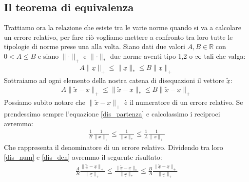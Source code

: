 \documentclass[12pt, a4paper]{book}
\theoremstyle{definition}
\newcommand{\VarMtrx}[1]{\ensuremath{\underline{#1}}}
\begin{document}
\subsection{Il teorema di equivalenza}
\begin{flushleft}
Trattiamo ora la relazione che esiste tra le varie norme quando si va a calcolare un errore relativo, per fare ciò vogliamo mettere a confronto tra loro tutte le tipologie di norme prese una alla volta. 
Siano dati due valori $A,B \in \mathbb{R}$ con $0<A \leq B$ e siano $\lVert \cdot \rVert_{+}$ e $\lVert \cdot \rVert_{*}$ due norme aventi tipo 1,2 o $\infty$ tali che valga: 
\begin{equation} \label{dis_partenza}
	\begin{split}
		A\lVert\VarMtrx{x}\rVert_{+} \leq \lVert\VarMtrx{x}\rVert_{*} \leq B\lVert\VarMtrx{x}\rVert_{+}
	\end{split}
\end{equation}
Sottraiamo ad ogni elemento della nostra catena di disequazioni il vettore $\widetilde{\VarMtrx{x}}$: 
\begin{equation} \label{dis_num}
	\begin{split}
		A\lVert\widetilde{\VarMtrx{x}} - \VarMtrx{x}\rVert_{+} \leq \lVert\widetilde{\VarMtrx{x}} - \VarMtrx{x}\rVert_{*} \leq B\lVert\widetilde{\VarMtrx{x}} - \VarMtrx{x}\rVert_{+}
	\end{split}
\end{equation}
Possiamo subito notare che $\lVert\widetilde{\VarMtrx{x}} - \VarMtrx{x}\rVert_{+}$ è il numeratore di un errore relativo.  Se prendessimo sempre l'equazione  \ref{dis_partenza} e calcolassimo i reciproci avremmo:
\begin{equation} \label{dis_den}
	\begin{split}
		\frac{1}{B}\frac{1}{\lVert\VarMtrx{x}\rVert_{+} }\leq \frac{1}{\lVert\VarMtrx{x}\rVert_{*}} \leq \frac{1}{A}\frac{1}{\lVert\VarMtrx{x}\rVert_{+} }
	\end{split}
\end{equation}
Che rappresenta il denominatore di un errore relativo.
Dividendo tra loro \ref{dis_num} e \ref{dis_den} avremmo il seguente risultato:
\begin{equation} \label{dis_err_rel}
	\begin{split}
		\frac{A}{B}\frac{\lVert\widetilde{\VarMtrx{x}} - \VarMtrx{x}\rVert_{+}}{\lVert\VarMtrx{x}\rVert_{+} }\leq \frac{\lVert\widetilde{\VarMtrx{x}} - \VarMtrx{x}\rVert_{*}}{\lVert\VarMtrx{x}\rVert_{*}} \leq \frac{B}{A}\frac{\lVert\widetilde{\VarMtrx{x}} - \VarMtrx{x}\rVert_{+}}{\lVert\VarMtrx{x}\rVert_{+} }

\end{split}
\end{equation}
\end{flushleft}
\end{document}

